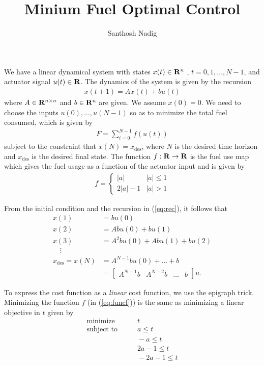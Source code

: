 \documentclass[a4paper,10pt]{article}
\title{Minium Fuel Optimal Control}
\author{Santhosh Nadig}
\def\bR{{\bf R}}
\newcommand{\abs}[1]{|#1|}
\begin{document}
\maketitle
We have a linear dynamical system with states $x(t) \in \bR^n$ , $t = 0,1,\dots,N-1$, and actuator signal $u(t) \in \bR$. The dynamics of the system is given by the recursion
\begin{align}
x(t+1) = Ax(t) + b u(t)
\label{eq:rec}
\end{align}
where $A \in \bR^{n\times n}$ and $b \in \bR^n$ are given. We assume $x(0) = 0$. We need to choose the inputs $u(0),\dots,u(N-1)$ so as to minimize the total fuel consumed, which is given by
\begin{align}
F = \sum_{i = 0}^{N-1} f(u(t))
\label{eq:costfunc}
\end{align}
subject to the constraint that $x(N) = x_{\text{des}}$, where $N$ is the desired time horizon and $x_{\text{des}}$ is the desired final state. The function $f: \bR \rightarrow \bR$ is the fuel use map which gives the fuel usage as a function of the actuator input and is given by
\begin{align}
f = \begin{cases}
\abs{a} & \abs{a} \le 1 \\
2\abs{a} - 1 & \abs{a} > 1
\end{cases}
\label{eq:funcf}
\end{align}

From the initial condition and the recursion in (\ref{eq:rec}), it follows that
\begin{align*}
x(1) &= bu(0) \\
x(2) &= Abu(0) + bu(1) \\
x(3) &= A^2bu(0) + Abu(1) + bu(2) \\
\quad \vdots \\
x_{\text{des}} = x(N) &= A^{N-1}bu(0) + \dots + b \\
&= \begin{bmatrix}
 A^{N-1}b & A^{N-2}b & \dots &b
\end{bmatrix}
u.
\end{align*}

To express the cost function as a {\em linear} cost function, we use the epigraph trick. Minimizing the function $f$ (in (\ref{eq:funcf})) is the same as minimizing a linear objective in $t$ given by
\begin{align*}
\text{minimize} & \qquad t \\
\text{subject~to} & \qquad a \le t \\
& \qquad -a \le t \\
& \qquad 2a-1 \le t \\
& \qquad-2a-1 \le t
\end{align*}
\end{document}
